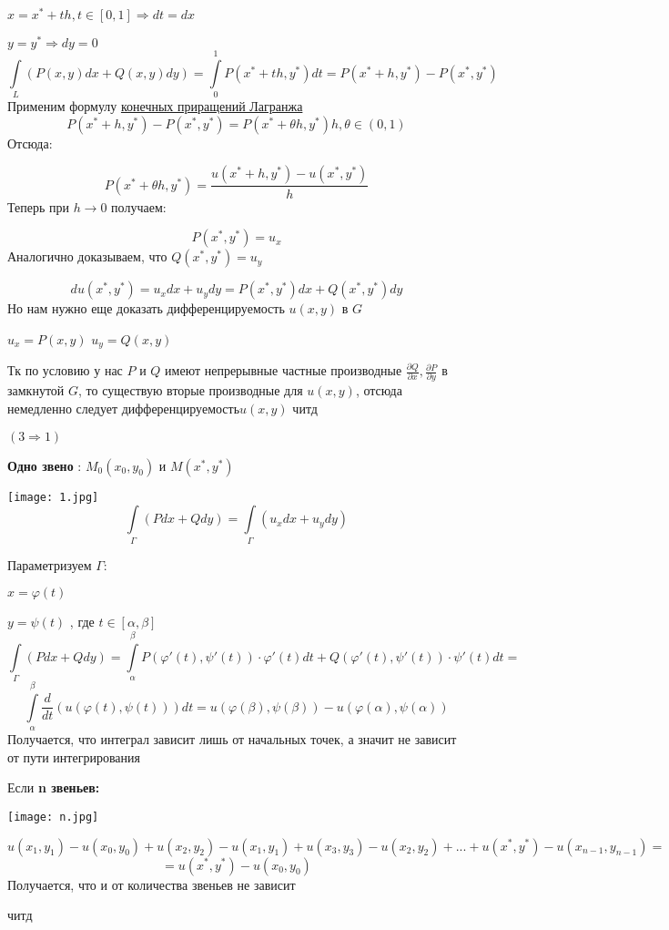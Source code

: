 \documentclass[12pt]{article}
\begin{document}
	$x = x^* + th , t \in [0,1] \Rightarrow dt = dx$
	
	$y = y^* \Rightarrow dy = 0$
$$
\int\limits_{L} (P(x,y)dx + Q(x,y)dy) = \int\limits_{0}^{1}P(x^* + th,y^*)dt
=
P(x^* + h,y^*) - P(x^*,y^*)
$$	
Применим формулу \hyperref[eq5]{конечных приращений Лагранжа}
$$
P(x^* + h,y^*) - P(x^*,y^*) = P(x^* + \theta h,y^*)h  ,\theta \in (0,1)
$$
Отсюда:
	
$$
P(x^* + \theta h,y^*) 
=
\frac{u(x^* + h , y^*) - u(x^* , y^*)}{h}
$$
Теперь при $h \to 0$	 получаем:

$$
P(x^* , y^*) 
=
u_x
$$
Аналогично доказываем, что $Q(x^* , y^*) = u_y$

$$
du(x^* , y^*) = u_x dx + u_y dy = P(x^* , y^*) dx + Q(x^* , y^*) dy
$$
Но нам нужно еще доказать дифференцируемость $u(x,y)$ в $G$

$u_x = P(x , y)$
$u_y = Q(x , y)$

Тк по условию у нас $P$ и $Q$ имеют непрерывные частные производные $\frac{\partial Q}{\partial x},\frac{\partial P}{\partial y} $ в замкнутой $G$, то существую вторые производные для $u(x,y)$, отсюда немедленно следует дифференцируемость$u(x,y)$
читд	
	
$(3 \Rightarrow 1)$	

\textbf{Одно звено} : $M_0(x_0 , y_0)$ и $M(x^* , y^*)$ 

\texttt{[image: 1.jpg]}
$$
\int\limits_{\Gamma} (Pdx + Qdy) 
=
\int\limits_{\Gamma} (u_xdx + u_ydy) 
$$

Параметризуем $\Gamma$:

 $ x = \varphi(t)$
 
 $ y = \psi(t)$ , где $t \in [\alpha , \beta]$
$$
\int\limits_{\Gamma} (Pdx + Qdy)
=
\int\limits_{\alpha}^{\beta} P(\varphi'(t) , \psi'(t)) \cdot \varphi'(t)dt 
+ Q(\varphi'(t) , \psi'(t)) \cdot \psi'(t)dt 
=
$$
$$
\int\limits_{\alpha}^{\beta} \frac{d}{dt}(u(\varphi(t) ,\psi(t)))dt 
= 
u(\varphi(\beta) ,\psi(\beta)) -  u(\varphi(\alpha) ,\psi(\alpha))
$$
Получается, что интеграл зависит лишь от начальных точек, а значит не зависит от пути интегрирования

Если \textbf{n звеньев:}

\texttt{[image: n.jpg]}	

$$
u(x_1 , y_1) - u(x_0 , y_0) 
+ 
u(x_2 , y_2) - u(x_1 , y_1)
+ 
u(x_3 , y_3) - u(x_2 , y_2)
+ ... +
u(x^* , y^*) - u(x_{n-1} , y_{n-1})
=
$$
$$
=
u(x^* , y^*) - u(x_0 , y_0)
$$
Получается, что и от количества звеньев не зависит

читд
\end{document}
